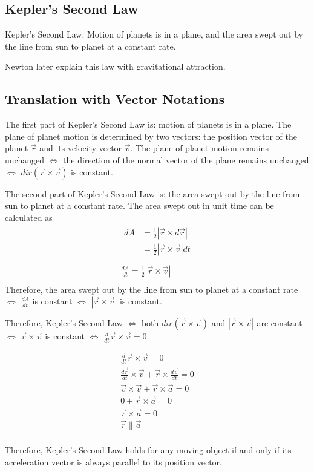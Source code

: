 \documentclass{article}
\begin{document}
\subsection{Kepler's Second Law}

Kepler's Second Law: Motion of planets is in a plane, and the area swept out by 
the line from sun to planet at a constant rate.

Newton later explain this law with gravitational attraction.

\subsection{Translation with Vector Notations}

The first part of Kepler's Second Law is: motion of planets is in a plane. The 
plane of planet motion is determined by two vectors: the position vector of the 
planet $\vec{r}$ and its velocity vector $\vec{v}$. The plane of planet motion 
remains unchanged $\iff$ the direction of the normal vector of the plane remains
unchanged $\iff$ $dir(\vec{r} \times \vec{v})$ is constant.

The second part of Kepler's Second Law is: the area swept out by the line from 
sun to planet at a constant rate. The area swept out in unit time can be 
calculated as
\begin{gather*}
  \begin{split}
    dA &= \frac{1}{2}|\vec{r} \times d\vec{r}| \\
       &= \frac{1}{2}|\vec{r} \times \vec{v}| dt \\
  \end{split} \\
  \frac{dA}{dt} = \frac{1}{2}|\vec{r} \times \vec{v}| \\
\end{gather*}
Therefore, the area swept out by the line from sun to planet at a constant rate 
$\iff$ $\frac{dA}{dt}$ is constant $\iff$ $|\vec{r} \times \vec{v}|$ is constant.

Therefore, Kepler's Second Law $\iff$ both $dir(\vec{r} \times \vec{v})$ and 
$|\vec{r} \times \vec{v}|$ are constant $\iff$ $\vec{r} \times \vec{v}$ is 
constant $\iff$ $\frac{d}{dt}\vec{r} \times \vec{v} = 0$.

\begin{gather*}
  \frac{d}{dt}\vec{r} \times \vec{v} = 0 \\
  \frac{d\vec{r}}{dt} \times \vec{v} + \vec{r} \times \frac{d\vec{v}}{dt} = 0 \\
  \vec{v} \times \vec{v} + \vec{r} \times \vec{a} = 0 \\
  0 + \vec{r} \times \vec{a} = 0 \\
  \vec{r} \times \vec{a} = 0 \\
  \vec{r} \parallel \vec{a} \\
\end{gather*}

Therefore, Kepler's Second Law holds for any moving object if and only if its 
acceleration vector is always parallel to its position vector.
\end{document}
